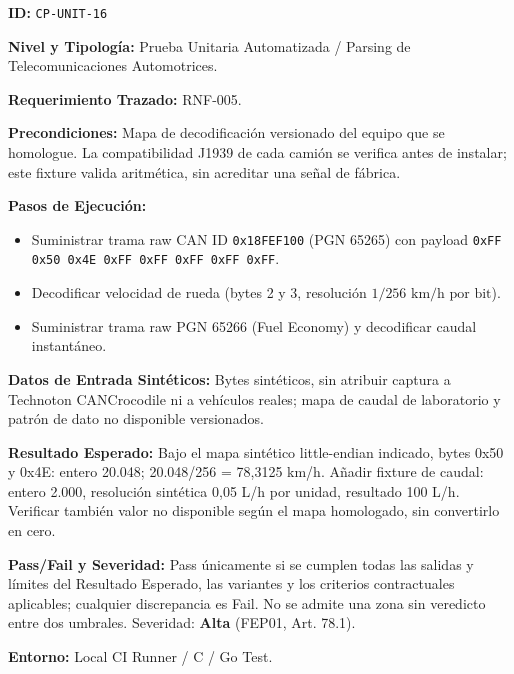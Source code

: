 \par\noindent\textbf{ID:} \texttt{CP-\allowbreak{}UNIT-\allowbreak{}16}\par
\par\noindent\textbf{Nivel y Tipología:} Prueba Unitaria Automatizada / Parsing de Telecomunicaciones Automotrices.\par
\par\noindent\textbf{Requerimiento Trazado:} RNF-005.\par
\par\noindent\textbf{Precondiciones:} Mapa de decodificación versionado del equipo que se homologue. La compatibilidad J1939 de cada camión se verifica antes de instalar; este fixture valida aritmética, sin acreditar una señal de fábrica.\par
\par\noindent\textbf{Pasos de Ejecución:}\par
\begin{itemize}
\item Suministrar trama raw CAN ID \texttt{0x18FEF100} (PGN 65265) con payload \texttt{0xFF 0x50 0x4E 0xFF 0xFF 0xFF 0xFF 0xFF}.
\item Decodificar velocidad de rueda (bytes 2 y 3, resolución \(1/256\text{ km/h por bit}\)).
\item Suministrar trama raw PGN 65266 (Fuel Economy) y decodificar caudal instantáneo.
\end{itemize}

\par\noindent\textbf{Datos de Entrada Sintéticos:} Bytes sintéticos, sin atribuir captura a Technoton CANCrocodile ni a vehículos reales; mapa de caudal de laboratorio y patrón de dato no disponible versionados.\par
\par\noindent\textbf{Resultado Esperado:} Bajo el mapa sintético little-endian indicado, bytes 0x50 y 0x4E: entero 20.048; 20.048/256 = 78,3125 km/h. Añadir fixture de caudal: entero 2.000, resolución sintética 0,05 L/h por unidad, resultado 100 L/h. Verificar también valor no disponible según el mapa homologado, sin convertirlo en cero.\par
\par\noindent\textbf{Pass/Fail y Severidad:} Pass únicamente si se cumplen todas las salidas y límites del Resultado Esperado, las variantes y los criterios contractuales aplicables; cualquier discrepancia es Fail. No se admite una zona sin veredicto entre dos umbrales. Severidad: \textbf{Alta} (FEP01, Art. 78.1).\par
\par\noindent\textbf{Entorno:} Local CI Runner / C / Go Test.\par

